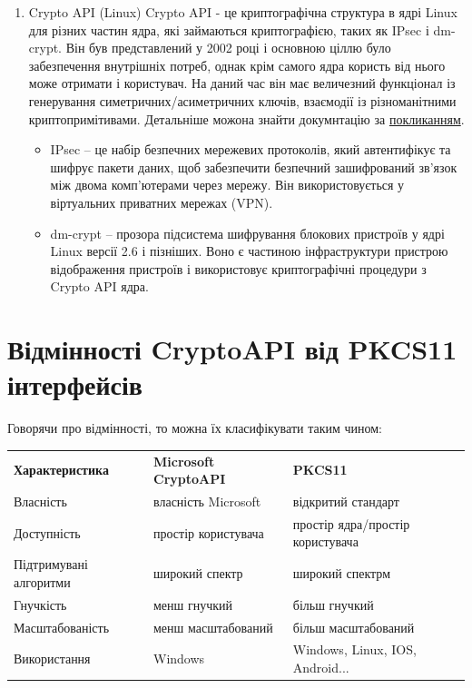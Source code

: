 \begin{enumerate}
    \item Crypto API (Linux)
    Crypto API - це криптографічна структура в ядрі Linux для різних частин ядра, які займаються криптографією, таких як IPsec і dm-crypt. Він був представлений у 2002 році і основною ціллю було забезпечення внутрішніх потреб, однак крім самого ядра користь від нього може отримати і користувач. На даний час він має величезний функціонал із генерування симетричних/асиметричних ключів, взаємодії із різноманітними криптопримітивами. Детальніше можона знайти докумнтацію за \href{https://www.kernel.org/doc/html/latest/crypto/index.html}{покликанням}. 

    \begin{remark}
    
        \begin{itemize}
            \item IPsec --  це набір безпечних мережевих протоколів, який автентифікує та шифрує пакети даних, щоб забезпечити безпечний зашифрований зв’язок між двома комп’ютерами через мережу. Він використовується у віртуальних приватних мережах (VPN).

            \item dm-crypt -- прозора підсистема шифрування блокових пристроїв у ядрі Linux версії 2.6 і пізніших. Воно є частиною інфраструктури пристрою відображення пристроїв і використовує криптографічні процедури з Crypto API ядра.
        \end{itemize}
    \end{remark}
    
\end{enumerate}

\section{Відмінності CryptoAPI від PKCS11 інтерфейсів}

Говорячи про відмінності, то можна їх класифікувати таким чином:

\begin{tabularx}{\textwidth}{X|X|X}
	\textbf{Характеристика} & \textbf{Microsoft CryptoAPI} & \textbf{PKCS11} \\
	      Власність & власність Microsoft & відкритий стандарт \\
        Доступність & простір користувача & простір ядра/простір користувача  \\
        Підтримувані алгоритми & широкий спектр & широкий спектрм \\
        Гнучкість & менш гнучкий & більш гнучкий \\
        Масштабованість & менш масштабований & більш масштабований \\
        Використання &  Windows & Windows, Linux, IOS, Android... \\	
\end{tabularx}

